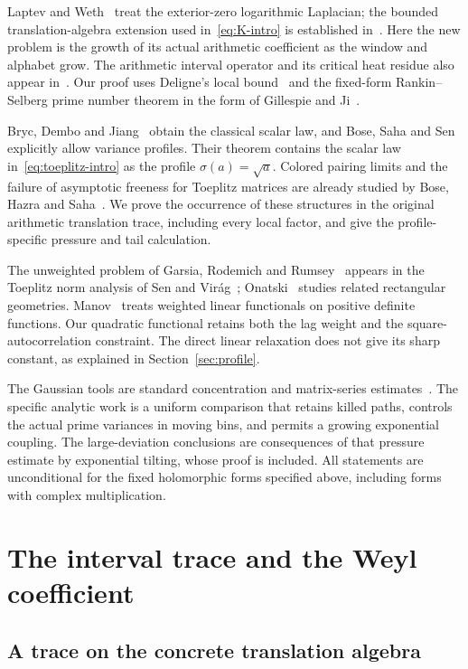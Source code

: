 \documentclass[11pt,reqno]{amsart}
\numberwithin{equation}{section}
\begin{document}
Laptev and Weth~\cite{LW} treat the exterior-zero logarithmic
Laplacian; the bounded translation-algebra extension used
in~\eqref{eq:K-intro} is established in~\cite{ChandruW}.
Here the new problem is the growth of its actual arithmetic
coefficient as the window and alphabet grow. The arithmetic interval
operator and its critical heat residue also appear in~\cite{ChandruB}.
Our proof uses
Deligne's local bound~\cite{Deligne} and the fixed-form
Rankin--Selberg prime number theorem in the form of
Gillespie and Ji~\cite{GJ}.

Bryc, Dembo and Jiang~\cite{BDJ} obtain the classical scalar law,
and Bose, Saha and Sen~\cite{BSS} explicitly allow variance profiles.
Their theorem contains the scalar law in~\eqref{eq:toeplitz-intro}
as the profile $\sigma(a)=\sqrt a$. Colored pairing limits and the
failure of asymptotic freeness for Toeplitz matrices are already
studied by Bose, Hazra and Saha~\cite{BHS}. We prove the occurrence
of these structures in the original arithmetic translation trace,
including every local factor, and give the profile-specific pressure
and tail calculation. 

The unweighted problem of Garsia, Rodemich and Rumsey~\cite{GRR}
appears in the Toeplitz norm analysis of Sen and Vir\'ag~\cite{SV};
Onatski~\cite{Onatski} studies related rectangular geometries.
Manov~\cite{Manov} treats weighted linear functionals on positive
definite functions. Our quadratic functional retains both the lag
weight and the square-autocorrelation constraint. The direct linear
relaxation does not give its sharp constant, as explained in
Section~\ref{sec:profile}. 

The Gaussian tools are standard concentration and matrix-series
estimates~\cite{Gross,Ledoux,Tropp}. The specific analytic work is a
uniform comparison that retains killed paths, controls the actual
prime variances in moving bins, and permits a growing exponential
coupling. The large-deviation conclusions are consequences of that
pressure estimate by exponential tilting, whose proof is included.
All statements are unconditional for the fixed holomorphic forms
specified above, including forms with complex multiplication.

\section{The interval trace and the Weyl coefficient}\label{sec:objects}

\subsection*{A trace on the concrete translation algebra}
\end{document}
